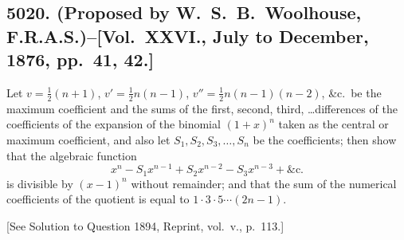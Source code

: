 \documentclass[11pt,a4paper]{article}
\theoremstyle{definition}
\begin{document}
\subsection*{5020. (Proposed by W.~S.~B.~Woolhouse, F.R.A.S.)\---[Vol.~XXVI., July to December, 1876, pp.~41, 42.]}

Let $v=\frac{1}{2}(n+1)$, $v'=\frac{1}{2}n(n-1)$, $v''=\frac{1}{2}n(n-1)(n-2)$, \&c.\ be the maximum coefficient and the sums of the first, second, third, \ldots differences of the coefficients of the expansion of the binomial $(1+x)^n$ taken as the central or maximum coefficient, and also let $S_1, S_2, S_3, \ldots, S_n$ be the coefficients; then show that the algebraic function
\[
x^n - S_1 x^{n-1} + S_2 x^{n-2} - S_3 x^{n-3} + \&\text{c.}
\]
is divisible by $(x-1)^n$ without remainder; and that the sum of the numerical coefficients of the quotient is equal to $1 \cdot 3 \cdot 5 \cdots (2n-1)$.

[See Solution to Question 1894, Reprint, vol.~v., p.~113.]
\end{document}
